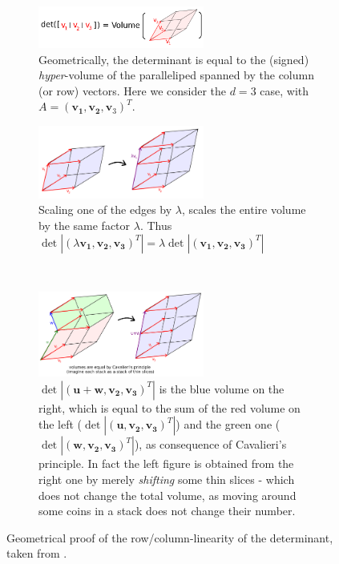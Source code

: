 \documentclass[../template.tex]{subfiles}
\begin{document}
\begin{figure}
    \centering
    \begin{subfigure}[b]{\textwidth}
        \centering
        \includegraphics[width=0.6\textwidth]{det0.png}
        \caption{Geometrically, the determinant is equal to the (signed) \textit{hyper}-volume of the paralleliped spanned by the column (or row) vectors. Here we consider the $d=3$ case, with $A = (\bm{v_1}, \bm{v_2}, \bm{v}_3)^T$.}
        \label{fig:scale-det}
    \end{subfigure}
    \begin{subfigure}[b]{\textwidth}
        \centering
        \includegraphics[width=0.6\textwidth]{det1.png}
        \caption{Scaling one of the edges by $\lambda$, scales the entire volume by the same factor $\lambda$. Thus $\operatorname{det}|(\lambda \bm{v_1}, \bm{v_2}, \bm{v_3})^T| = \lambda \operatorname{det}|(\bm{v_1}, \bm{v_2}, \bm{v_3})^T|$}
        \label{fig:scale-det}
    \end{subfigure}
    \\
    \begin{subfigure}[b]{\textwidth}
        \centering
        \includegraphics[width=0.6\textwidth]{det2.png}
        \caption{
        $\operatorname{det}|(\bm{u} + \bm{w}, \bm{v_2}, \bm{v_3})^T|$ is the blue volume on the right, which is equal to the sum of the red volume on the left
($\operatorname{det}|(\bm{u}, \bm{v_2}, \bm{v_3})^T|$) and the green one ($\operatorname{det}|(\bm{w}, \bm{v_2}, \bm{v_3})^T|$), as consequence of Cavalieri's principle. In fact the left figure is obtained from the right one by merely \textit{shifting} some thin slices - which does not change the total volume, as moving around some coins in a stack does not change their number.}
        \label{fig:sum-det}
    \end{subfigure}
       \caption{Geometrical proof of the row/column-linearity of the determinant, taken from \cite{proofdet}.}
       \label{fig:det-linear}
\end{figure}
\end{document}
